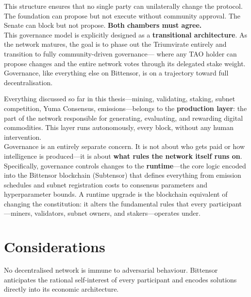 \documentclass[12pt, a4paper, oneside]{report}
\theoremstyle{definition}
\begin{document}
This structure ensures that no single party can unilaterally change the 
protocol. The foundation can propose but not execute without community 
approval. The Senate can block but not propose. \textbf{Both chambers must 
agree.}\\[0.4cm]

This governance model is explicitly designed as a \textbf{transitional 
architecture}. As the network matures, the goal is to phase out the 
Triumvirate entirely and transition to fully community-driven governance—
where any TAO holder can propose changes and the entire network votes 
through its delegated stake weight. Governance, like everything else on 
Bittensor, is on a trajectory toward full decentralisation.



Everything discussed so far in this thesis—mining, validating, staking, subnet 
competition, Yuma Consensus, emissions—belongs to the \textbf{production layer}: 
the part of the network responsible for generating, evaluating, and rewarding 
digital commodities. This layer runs autonomously, every block, without any human 
intervention.\\[0.4cm]

Governance is an entirely separate concern. It is not about who gets paid or how 
intelligence is produced—it is about \textbf{what rules the network itself runs on}. 
Specifically, governance controls changes to the \textbf{runtime}—the core logic 
encoded into the Bittensor blockchain (Subtensor) that defines everything from 
emission schedules and subnet registration costs to consensus parameters and 
hyperparameter bounds. A runtime upgrade is the blockchain equivalent of changing 
the constitution: it alters the fundamental rules that every participant—miners, 
validators, subnet owners, and stakers—operates under. 










\section{Considerations}
\label{sec:issues}

No decentralised network is immune to adversarial behaviour. Bittensor anticipates 
the rational self-interest of every participant and encodes solutions directly into 
its economic architecture.
\end{document}
